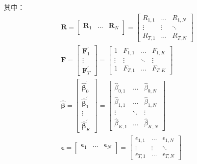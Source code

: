 \documentclass[11pt]{article}
\begin{document}
其中：
\begin{gather*}
    \bm{R} = \begin{bmatrix}
        \bm{R}_1 & \dots & \bm{R}_N \\
    \end{bmatrix}
    = \begin{bmatrix} R_{1,1} & \dots & R_{1,N} \\ \vdots & \vdots & \ddots \\ R_{T,1} & \dots & R_{T,N} \end{bmatrix}
    \\
    \bm{F} = \begin{bmatrix} \bm{F}_{1}^{'} \\ \vdots \\ \bm{F}_{T}^{'} \end{bmatrix}
    = \begin{bmatrix} 1 & F_{1,1} & \dots & F_{1,K} \\ \vdots & \vdots & \ddots & \vdots \\ 1 & F_{T,1} & \dots & F_{T,K} \end{bmatrix} 
    \\
    \hat{\bm{\beta}}
    = \begin{bmatrix} \bm{\hat{\beta}}_{0}^{'} \\ \bm{\hat{\beta}}_{1}^{'} \\ \vdots \\ \bm{\hat{\beta}}_{K}^{'} \end{bmatrix}
    = \begin{bmatrix} \hat{\beta}_{0,1} & \dots & \hat{\beta}_{0,N} \\ \hat{\beta}_{1,1} & \dots & \hat{\beta}_{1,N} \\ \vdots & \ddots & \vdots \\ \hat{\beta}_{K,1} & \dots & \hat{\beta}_{K,N} \end{bmatrix}
    \\
    \bm{\epsilon} = \begin{bmatrix}
        \bm{\epsilon}_1 & \dots & \bm{\epsilon}_N \\
    \end{bmatrix}
    = \begin{bmatrix} \epsilon_{1,1} & \dots & \epsilon_{1,N} \\ \vdots & \vdots & \ddots \\ \epsilon_{T,1} & \dots & \epsilon_{T,N} \end{bmatrix}
\end{gather*}
\end{document}
